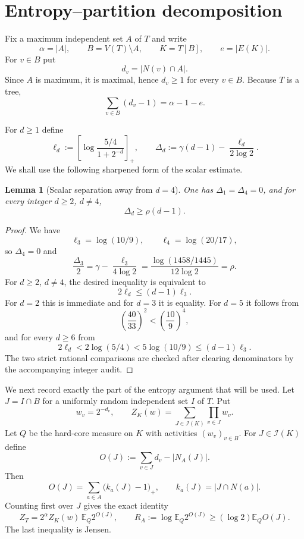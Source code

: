\documentclass[11pt]{article}
\newtheorem{lemma}[theorem]{Lemma}
\newcommand{\E}{\mathbb E}
\newcommand{\Ical}{\mathcal I}
\begin{document}
\section{Entropy--partition decomposition}

Fix a maximum independent set $A$ of $T$ and write
\[
 \alpha=|A|,
 \qquad B=V(T)\setminus A,
 \qquad K=T[B],
 \qquad e=|E(K)|.
\]
For $v\in B$ put
\[
 d_v=|N(v)\cap A|.
\]
Since $A$ is maximum, it is maximal, hence $d_v\ge1$ for every $v\in B$.
Because $T$ is a tree,
\begin{equation}\label{eq:edgeidentity}
 \sum_{v\in B}(d_v-1)=\alpha-1-e.
\end{equation}

For $d\ge1$ define
\[
 \ell_d:=\left[\log\frac{5/4}{1+2^{-d}}\right]_+,
 \qquad
 \Delta_d:=\gamma(d-1)-\frac{\ell_d}{2\log2}.
\]
We shall use the following sharpened form of the scalar estimate.

\begin{lemma}[Scalar separation away from $d=4$]\label{lem:scalar}
One has $\Delta_1=\Delta_4=0$, and for every integer $d\ge2$, $d\ne4$,
\[
 \Delta_d\ge \rho(d-1).
\]
\end{lemma}

\begin{proof}
We have
\[
 \ell_3=\log(10/9),
 \qquad
 \ell_4=\log(20/17),
\]
so $\Delta_4=0$ and
\[
 \frac{\Delta_3}{2}
 =\gamma-\frac{\ell_3}{4\log2}
 =\frac{\log(1458/1445)}{12\log2}=\rho.
\]
For $d\ge2$, $d\ne4$, the desired inequality is equivalent to
\begin{equation}\label{eq:scalar_equiv}
 2\ell_d\le(d-1)\ell_3.
\end{equation}
For $d=2$ this is immediate and for $d=3$ it is equality.  For $d=5$ it follows from
\[
 \left(\frac{40}{33}\right)^2
 <\left(\frac{10}{9}\right)^4,
\]
and for every $d\ge6$ from
\[
 2\ell_d<2\log(5/4)
 <5\log(10/9)
 \le(d-1)\ell_3.
\]
The two strict rational comparisons are checked after clearing denominators by the accompanying integer audit.
\end{proof}

We next record exactly the part of the entropy argument that will be used.  Let $J=I\cap B$ for a uniformly random independent set $I$ of $T$.  Put
\[
 w_v=2^{-d_v},
 \qquad
 Z_K(w)=\sum_{J\in\Ical(K)}\prod_{v\in J}w_v.
\]
Let $Q$ be the hard-core measure on $K$ with activities $(w_v)_{v\in B}$.
For $J\in\Ical(K)$ define
\[
 O(J):=\sum_{v\in J}d_v-|N_A(J)|.
\]
Then
\begin{equation}\label{eq:overlap}
 O(J)=\sum_{a\in A}\bigl(k_a(J)-1\bigr)_+,
 \qquad
 k_a(J)=|J\cap N(a)|.
\end{equation}
Counting first over $J$ gives the exact identity
\begin{equation}\label{eq:RA}
 Z_T
 =2^\alpha Z_K(w)\,\E_Q 2^{O(J)},
 \qquad
 R_A:=\log\E_Q2^{O(J)}\ge(\log2)\E_Q O(J).
\end{equation}
The last inequality is Jensen.
\end{document}

